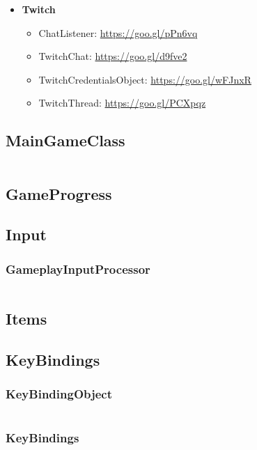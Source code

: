 \documentclass[12p]{article}
\begin{document}
\begin{itemize}
    \item \textbf{Twitch}
    \begin{itemize}
        \item ChatListener: \url{https://goo.gl/pPn6vq}
        \item TwitchChat: \url{https://goo.gl/d9fve2}
        \item TwitchCredentialsObject: \url{https://goo.gl/wFJnxR}
        \item TwitchThread: \url{https://goo.gl/PCXpqz}
    \end{itemize}
\end{itemize}

\subsection{MainGameClass} \label{MainGameClass.java}
\inputminted[linenos,breaklines]{java}{code/MainGameClass.java}

\subsection{GameProgress}

\subsection{Input}
\subsubsection{GameplayInputProcessor} \label{GameplayInputProcessor.java}
\inputminted[linenos,breaklines]{java}{code/Input/GameplayInputProcessor.java}

\subsection{Items}

\subsection{KeyBindings}
\subsubsection{KeyBindingObject} \label{KeyBindingObject.java}
\inputminted[linenos,breaklines]{java}{code/KeyBindings/KeyBindingObject.java}
\subsubsection{KeyBindings} \label{KeyBindings.java}
\inputminted[linenos,breaklines]{java}{code/KeyBindings/KeyBindings.java}
\end{document}
